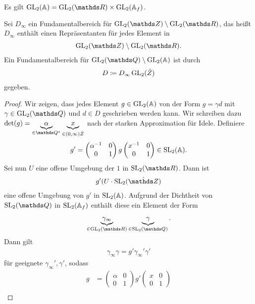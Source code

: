Es gilt $\GL_2(\A)=\GL_2(\R)\times \GL_2(\A_f)$.
\begin{prop}
Sei $D_\infty$ ein Fundamentalbereich für $\GL_2(\Z)\setminus \GL_2(\R)$,
das heißt $D_\infty$ enthält einen Repräsentanten für jedes Element in
\begin{align*}
\GL_2(\Z)\setminus \GL_2(\R).
\end{align*}
Ein Fundamentalbereich für $\GL_2(\Q)\setminus \GL_2(\A)$ ist durch
\begin{align*}
D\coloneqq D_\infty \operatorname{GL}_2(\hat{Z})
\end{align*}
gegeben.
\end{prop}
\begin{proof}
Wir zeigen, dass jedes Element $g\in \operatorname{GL}_2(\mathbb{A})$ von der Form $g=\gamma d$ mit $\gamma \in \GL_2(\Q)$ und $d\in D$ geschrieben werden kann.
Wir schreiben dazu $\det(g)=\underbrace{\alpha}_{\in \Q^\ast} \underbrace{x}_{\in (0,\infty) \hat{Z}}$ nach der starken Approximation für Idele.
Definiere
\begin{align*}
g'=\begin{pmatrix}
\alpha^{-1}&0\\
0&1
\end{pmatrix}
g
\begin{pmatrix}
x^{-1}&0\\
0&1
\end{pmatrix} \in \operatorname{SL}_2(\mathbb{A}).
\end{align*}
Sei nun $U$ eine offene Umgebung der $1$ in $\SL_2(\R)$.
Dann ist
\begin{align*}
g'(U \cdot \SL_2(\hat{\Z})
\end{align*}
eine offene Umgebung von $g'$ in $\operatorname{SL}_2(\mathbb{A})$.
Aufgrund der Dichtheit von $\SL_2(\Q)$ in $\operatorname{SL}_2(\mathbb{A}_f)$ enthält diese ein Element der Form
\begin{align*}
\underbrace{\gamma_\infty}_{\in \GL_2(\R)} \underbrace{\gamma}_{\in \SL_2(\Q)}.
\end{align*}
Dann gilt
\begin{align*}
\gamma_\infty \gamma =g' \gamma_\infty' \gamma'
\end{align*}
für geeignete $\gamma_\infty',\gamma'$,
sodass
\begin{align*}
g&=\begin{pmatrix}
\alpha&0\\
0&1
\end{pmatrix} g' \begin{pmatrix}
x&0\\
0&1
\end{pmatrix}\\

\end{align*}
\end{proof}
